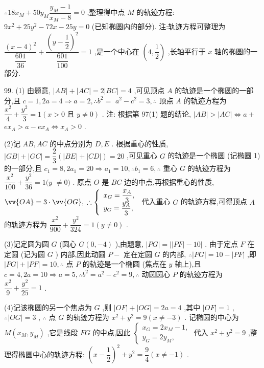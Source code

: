 $\therefore {18}{x}_{M} + {50}{y}_{M}\dfrac{{y}_{M} - 1}{{x}_{M} - 8} = 0$ ,整理得中点 $M$ 的轨迹方程: $9{x}^{2} + {25}{y}^{2} - {72x} - {25y} = 0$ (已知椭圆内的部分). 注:轨迹方程可整理为 $\dfrac{{\left( x - 4\right) }^{2}}{\dfrac{601}{36}} + \dfrac{{\left( y - \dfrac{1}{2}\right) }^{2}}{\dfrac{601}{100}} = 1$ ,是一个中心在 $\left( {4,\dfrac{1}{2}}\right)$ ,长轴平行于 $x$ 轴的椭圆的一部分.

99. (1) 由题意, $\left| {AB}\right|  + \left| {AC}\right|  = 2\left| {BC}\right|  = 4$ ,可见顶点 $A$ 的轨迹是一个椭圆的一部分,且 $c = 1,{2a} = 4 \Rightarrow  a = 2,\therefore {b}^{2} =$  ${a}^{2} - {c}^{2} = 3,\therefore$ 顶点 $A$ 的轨迹方程为 $\dfrac{{x}^{2}}{4} + \dfrac{{y}^{2}}{3} = 1\left( {x > 0\text{ 且 }y \neq  0}\right)$ . 注: 根据第 97(1) 题的结论, $\left| {AB}\right|  > \left| {AC}\right|  \Leftrightarrow  a +$  $e{x}_{A} > a - e{x}_{A} \Leftrightarrow  {x}_{A} > 0$ .

(2)记 ${AB},{AC}$ 的中点分别为 $D,E$ . 根据重心的性质, $\left| {GB}\right|  + \left| {GC}\right|  = \dfrac{2}{3}\left( {\left| {BE}\right|  + \left| {CD}\right| }\right)  = {20}$ ,可见重心 $G$ 的轨迹是一个椭圆 (记椭圆 1) 的一部分,且 ${c}_{1} = 8,2{a}_{1} = {20} \Rightarrow  {a}_{1} = {10},\therefore {b}_{1} = 6,\therefore$ 重心 $G$ 的轨迹方程为 $\dfrac{{x}^{2}}{100} + \dfrac{{y}^{2}}{36} = 1(y$  $\neq  0)$ . 原点 $O$ 是 ${BC}$ 边的中点,再根据重心的性质, $\vv{OA} = 3 \cdot  \vv{OG},\;\therefore \left\{  \begin{array}{l} {x}_{G} = \dfrac{{x}_{A}}{3}, \\  {y}_{G} = \dfrac{{y}_{A}}{3}, \end{array}\right.$ 代入重心 $G$ 的轨迹方程,可得顶点 $A$ 的轨迹方程为 $\dfrac{{x}^{2}}{900} + \dfrac{{y}^{2}}{324} = 1\left( {y \neq  0}\right)$ .

(3)记定圆为圆 $G$ (圆心 $G\left( {0, - 4}\right)$ ),由题意, $\left| {PG}\right|  = \left| {\left| {PF}\right|  - {10}}\right|$ . 由于定点 $F$ 在定圆 (记为圆 $G$ ) 内部,因此动圆 $P -$ 定在定圆 $G$ 的内部, $\therefore \left| {PG}\right|  = {10} - \left| {PF}\right|$ ,即 $\left| {PG}\right|  + \left| {PF}\right|  = {10},\therefore$ 点 $P$ 的轨迹是一个椭圆 (焦点在 $y$ 轴上),且 $c = 4,{2a} = {10} \Rightarrow  a = 5,\therefore {b}^{2} = {a}^{2} - {c}^{2} = 9,\therefore$ 动圆圆心 $P$ 的轨迹方程为 $\dfrac{{x}^{2}}{9} + \dfrac{{y}^{2}}{25} = 1$ .

(4)记该椭圆的另一个焦点为 $G$ ,则 $\left| {OF}\right|  + \left| {OG}\right|  = {2a} = 4$ ,其中 $\left| {OF}\right|  = 1$ , $\therefore \left| {OG}\right|  = 3$ , $\therefore$ 点 $G$ 的轨迹方程为 ${x}^{2} + {y}^{2} = 9\left( {x \neq   - 3}\right)$ . 记椭圆的中心为 $M\left( {{x}_{M},{y}_{M}}\right)$ ,它是线段 ${FG}$ 的中点,因此 $\left\{  \begin{array}{l} {x}_{G} = 2{x}_{M} - 1, \\  {y}_{G} = 2{y}_{M}, \end{array}\right.$ 代入 ${x}^{2} + {y}^{2} = 9$ ,整理得椭圆中心的轨迹方程: ${\left( x - \dfrac{1}{2}\right) }^{2} + {y}^{2} = \dfrac{9}{4}\left( {x \neq   - 1}\right)$ .

